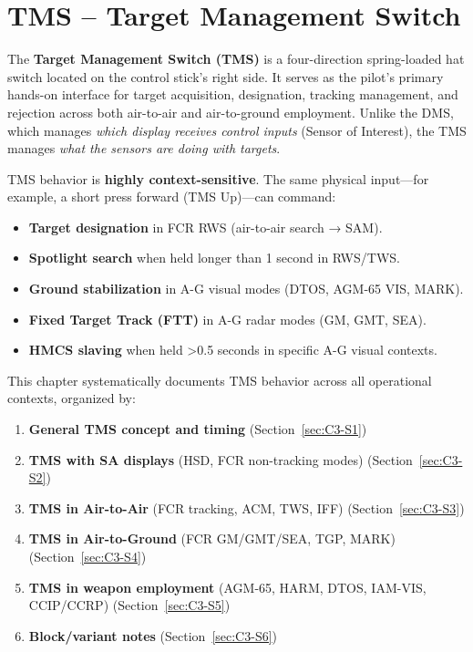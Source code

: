 \documentclass[11pt, a4paper, twoside]{report}
\begin{document}
\chapter{TMS -- Target Management Switch}
\label{chap:C3}


The \textbf{Target Management Switch (TMS)} is a four-direction spring-loaded hat switch located on the control stick's right side. It serves as the pilot's primary hands-on interface for target acquisition, designation, tracking management, and rejection across both air-to-air and air-to-ground employment. Unlike the DMS, which manages \textit{which display receives control inputs} (Sensor of Interest), the TMS manages \textit{what the sensors are doing with targets}.

TMS behavior is \textbf{highly context-sensitive}. The same physical input---for example, a short press forward (TMS Up)---can command:
\begin{itemize}
    \item \textbf{Target designation} in FCR RWS (air-to-air search → SAM).
    \item \textbf{Spotlight search} when held longer than 1 second in RWS/TWS.
    \item \textbf{Ground stabilization} in A-G visual modes (DTOS, AGM-65 VIS, MARK).
    \item \textbf{Fixed Target Track (FTT)} in A-G radar modes (GM, GMT, SEA).
    \item \textbf{HMCS slaving} when held >0.5 seconds in specific A-G visual contexts.
\end{itemize}

This chapter systematically documents TMS behavior across all operational contexts, organized by:
\begin{enumerate}
    \item \textbf{General TMS concept and timing} (Section~\ref{sec:C3-S1})
    \item \textbf{TMS with SA displays} (HSD, FCR non-tracking modes) (Section~\ref{sec:C3-S2})
    \item \textbf{TMS in Air-to-Air} (FCR tracking, ACM, TWS, IFF) (Section~\ref{sec:C3-S3})
    \item \textbf{TMS in Air-to-Ground} (FCR GM/GMT/SEA, TGP, MARK) (Section~\ref{sec:C3-S4})
    \item \textbf{TMS in weapon employment} (AGM-65, HARM, DTOS, IAM-VIS, CCIP/CCRP) (Section~\ref{sec:C3-S5})
    \item \textbf{Block/variant notes} (Section~\ref{sec:C3-S6})
\end{enumerate}
\end{document}
